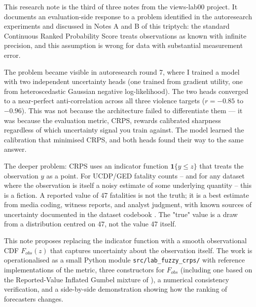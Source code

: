 This research note is the third of three notes from the views-lab00 project. It documents an evaluation-side response to a problem identified in the autoresearch experiments and discussed in Notes A and B of this triptych: the standard Continuous Ranked Probability Score \citep{gneiting2007strictly} treats observations as known with infinite precision, and this assumption is wrong for data with substantial measurement error.

The problem became visible in autoresearch round 7, where I trained a model with two independent uncertainty heads (one trained from gradient utility, one from heteroscedastic Gaussian negative log-likelihood). The two heads converged to a near-perfect anti-correlation across all three violence targets ($r = -0.85$ to $-0.96$). This was not because the architecture failed to differentiate them — it was because the evaluation metric, CRPS, rewards calibrated sharpness regardless of which uncertainty signal you train against. The model learned the calibration that minimised CRPS, and both heads found their way to the same answer.

The deeper problem: CRPS uses an indicator function $\mathbf{1}\{y \le z\}$ that treats the observation $y$ as a point. For UCDP/GED fatality counts -- and for any dataset where the observation is itself a noisy estimate of some underlying quantity -- this is a fiction. A reported value of 47 fatalities is not the truth; it is a best estimate from media coding, witness reports, and analyst judgment, with known sources of uncertainty documented in the dataset codebook \citep{ucdp_codebook}. The "true" value is a draw from a distribution centred on 47, not the value 47 itself.

This note proposes replacing the indicator function with a smooth observational CDF $F_{obs}(z)$ that captures uncertainty about the observation itself. The work is operationalised as a small Python module \texttt{src/lab\_fuzzy\_crps/} with reference implementations of the metric, three constructors for $F_{obs}$ (including one based on the Reported-Value Inflated Gumbel mixture of \citealt{vesco2026uncertainty}), a numerical consistency verification, and a side-by-side demonstration showing how the ranking of forecasters changes.
